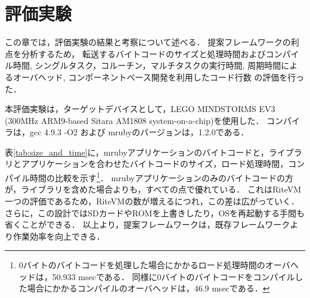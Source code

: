 \documentclass[submit,techrep]{ipsj}
\begin{document}
\section{評価実験}
\vspace{-2mm}
\label{sec:Evaluation}
この章では，評価実験の結果と考察について述べる．
提案フレームワークの利点を分析するため，
転送するバイトコードのサイズと処理時間およびコンパイル時間, 
シングルタスク，コルーチン，マルチタスクの実行時間, 
周期時間によるオーバヘッド,
コンポーネントベース開発を利用したコード行数
の評価を行った．

本評価実験は，ターゲットデバイスとして，LEGO MINDSTORMS EV3 (300MHz ARM9-based Sitara AM1808 system-on-a-chip)を使用した．
コンパイラは，gcc 4.9.3 -O2 および mrubyのバージョンは，1.2.0である．

表\ref{tab:size_and_time}に，mrubyアプリケーションのバイトコードと，ライブラリとアプリケーションを合わせたバイトコードのサイズ，ロード処理時間，コンパイル時間の比較を示す\footnote{0バイトのバイトコードを処理した場合にかかるロード処理時間のオーバヘッドは，50.933 msecである．
同様に0バイトのバイトコードをコンパイルした場合にかかるコンパイルのオーバヘッドは，46.9 msecである．}．
mrubyアプリケーションのみのバイトコードの方が，ライブラリを含めた場合よりも，すべての点で優れている．
これはRiteVM一つの評価であるため，RiteVMの数が増えるにつれ，この差は広がっていく．
さらに，この設計ではSDカードやROMを上書きしたり，OSを再起動する手間も省くことができる．
以上より，提案フレームワークは，既存フレームワークより作業効率を向上できる．
\end{document}
